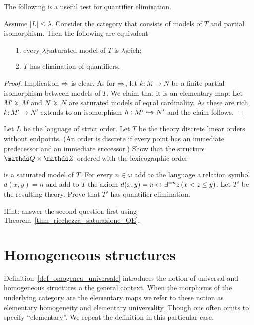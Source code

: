 \documentclass[creche.tex]{subfiles}
\begin{document}
The following is a useful test for quantifier elimination.

\begin{theorem}\label{thm_ricchezza_saturazione_QE}
Assume $|L|\le\lambda$. Consider the category that consists of models of $T$ and partial isomorphism. Then the following are equivalent
\begin{itemize}
\item[1.] every $\lambda\jj$saturated model of $T$ is $\lambda\jj$rich;
\item[2.] $T$ has elimination of quantifiers.
\end{itemize}
\end{theorem}

\begin{proof}
Implication $\Rightarrow$ is clear. As for $\Rightarrow$, let $k:M\to N$ be a finite partial isomorphism between models of $T$. We claim that it is an elementary map. Let $M'\succeq M$ and $N'\succeq N$ are saturated models of equal cardinality. As these are rich, $k:M'\to N'$ extends to an isomorphism $h:M'\hookrightarrow\mathrel{\mspace{-15mu}}\rightarrow N'$ and the claim follows.
\end{proof}

\begin{exercise}\label{ex_QQxZZ_saturo}
Let $L$ be the language of strict order. Let $T$ be the theory discrete linear orders without endpoints. (An order is discrete if every point has an immediate predecessor and an immediate successor.) Show that the structure $\QQ\times\ZZ$ ordered with the lexicographic order 


is a saturated model of $T$. For every $n\in\omega$ add to the language a relation symbol $d(x,y)=n$ and add to $T$ the axiom $d(x,y)=n\leftrightarrow\exists^{=n} z\,(x<z\le y)$.   Let $T'$ be the resulting theory. Prove that $T'$ has quantifier elimination. 

Hint: answer the second question first using Theorem~\ref{thm_ricchezza_saturazione_QE}.\QED 
\end{exercise}


\section{Homogeneous structures}\label{homogeneous}
Definition~\ref{def_omogenea_universale} introduces the notion of universal and homogeneous structures a the general context. When the morphisms of the underlying category are the elementary maps we refer to these notion as elementary homogeneity and elementary universality. Though one often omits to specify ``elementary''. We repeat the definition in this particular case. 
\end{document}
